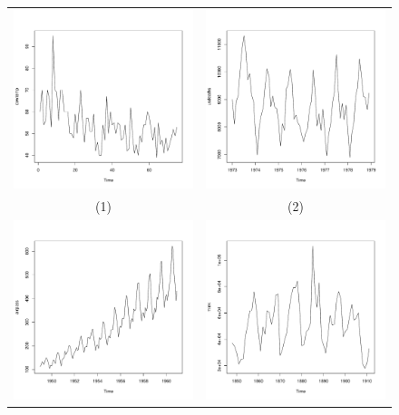 \documentclass[a4paper,11pt,oneside,onecolumn]{book}
\begin{document}
\newpage


\begin{figure}[!h]
\begin{tabular}{cc}
\includegraphics[width=.5\linewidth]{ cowtemp}&\includegraphics[width=.5\linewidth]{ usdeaths}\\
(1) & (2)\\
\includegraphics[width=.5\linewidth]{ airpass}&\includegraphics[width=.5\linewidth]{ mink}\\

\end{tabular}
\end{figure}
\end{document}
